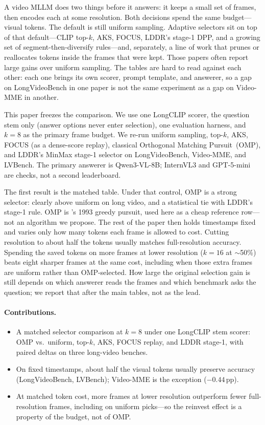 \documentclass[11pt]{article}
\begin{document}
A video MLLM does two things before it answers: it keeps a small set of frames, then encodes each at some resolution.
Both decisions spend the same budget---visual tokens.
The default is still uniform sampling.
Adaptive selectors sit on top of that default---CLIP top-$k$, AKS, FOCUS, LDDR's stage-1 DPP, and a growing set of segment-then-diversify rules---and, separately, a line of work that prunes or reallocates tokens inside the frames that were kept.
Those papers often report large gains over uniform sampling.
The tables are hard to read against each other: each one brings its own scorer, prompt template, and answerer, so a gap on LongVideoBench in one paper is not the same experiment as a gap on Video-MME in another.

This paper freezes the comparison.
We use one LongCLIP scorer, the question stem only (answer options never enter selection), one evaluation harness, and $k{=}8$ as the primary frame budget.
We re-run uniform sampling, top-$k$, AKS, FOCUS (as a dense-score replay), classical Orthogonal Matching Pursuit~(OMP), and LDDR's MinMax stage-1 selector on LongVideoBench, Video-MME, and LVBench.
The primary answerer is Qwen3-VL-8B; InternVL3 and GPT-5-mini are checks, not a second leaderboard.

The first result is the matched table.
Under that control, OMP is a strong selector: clearly above uniform on long video, and a statistical tie with LDDR's stage-1 rule.
OMP is \citet{pati1993omp}'s 1993 greedy pursuit, used here as a cheap reference row---not an algorithm we propose.
The rest of the paper then holds timestamps fixed and varies only how many tokens each frame is allowed to cost.
Cutting resolution to about half the tokens usually matches full-resolution accuracy.
Spending the saved tokens on more frames at lower resolution ($k{=}16$ at $\sim$50\%) beats eight sharper frames at the same cost, including when those extra frames are uniform rather than OMP-selected.
How large the original selection gain is still depends on which answerer reads the frames and which benchmark asks the question; we report that after the main tables, not as the lead.

\paragraph{Contributions.}
\begin{itemize}
\item A matched selector comparison at $k{=}8$ under one LongCLIP stem scorer: OMP vs.\ uniform, top-$k$, AKS, FOCUS replay, and LDDR stage-1, with paired deltas on three long-video benches.
\item On fixed timestamps, about half the visual tokens usually preserve accuracy (LongVideoBench, LVBench); Video-MME is the exception ($-0.44$\,pp).
\item At matched token cost, more frames at lower resolution outperform fewer full-resolution frames, including on uniform picks---so the reinvest effect is a property of the budget, not of OMP.
\end{itemize}
\end{document}

